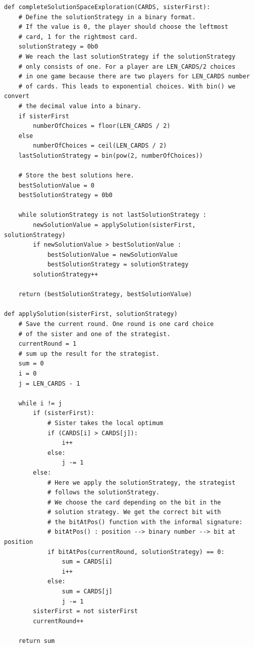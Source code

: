 \documentclass[a4paper,12pt,fleqn]{article}
\begin{document}
\begin{verbatim}
def completeSolutionSpaceExploration(CARDS, sisterFirst):
    # Define the solutionStrategy in a binary format.
    # If the value is 0, the player should choose the leftmost
    # card, 1 for the rightmost card.
    solutionStrategy = 0b0
    # We reach the last solutionStrategy if the solutionStrategy
    # only consists of one. For a player are LEN_CARDS/2 choices
    # in one game because there are two players for LEN_CARDS number
    # of cards. This leads to exponential choices. With bin() we convert
    # the decimal value into a binary.
    if sisterFirst 
        numberOfChoices = floor(LEN_CARDS / 2)
    else 
        numberOfChoices = ceil(LEN_CARDS / 2)
    lastSolutionStrategy = bin(pow(2, numberOfChoices))

    # Store the best solutions here.
    bestSolutionValue = 0
    bestSolutionStrategy = 0b0

    while solutionStrategy is not lastSolutionStrategy :
        newSolutionValue = applySolution(sisterFirst, solutionStrategy)
        if newSolutionValue > bestSolutionValue :
            bestSolutionValue = newSolutionValue
            bestSolutionStrategy = solutionStrategy
        solutionStrategy++

    return (bestSolutionStrategy, bestSolutionValue)

def applySolution(sisterFirst, solutionStrategy)
    # Save the current round. One round is one card choice
    # of the sister and one of the strategist.
    currentRound = 1
    # sum up the result for the strategist.
    sum = 0
    i = 0
    j = LEN_CARDS - 1

    while i != j
        if (sisterFirst):
            # Sister takes the local optimum
            if (CARDS[i] > CARDS[j]):
                i++
            else:
                j -= 1
        else:
            # Here we apply the solutionStrategy, the strategist
            # follows the solutionStrategy.
            # We choose the card depending on the bit in the 
            # solution strategy. We get the correct bit with 
            # the bitAtPos() function with the informal signature:
            # bitAtPos() : position --> binary number --> bit at position
            if bitAtPos(currentRound, solutionStrategy) == 0:
                sum = CARDS[i]
                i++
            else:
                sum = CARDS[j]
                j -= 1
        sisterFirst = not sisterFirst
        currentRound++

    return sum
\end{verbatim}
\end{document}
